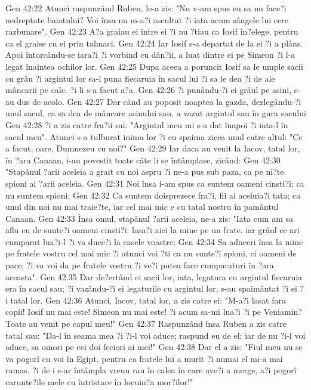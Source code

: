 Gen 42:22  Atunci raspunzând Ruben, le-a zis: "Nu v-am spus eu sa nu face?i nedreptate baiatului? Voi însa nu m-a?i ascultat ?i iata acum sângele lui cere razbunare".
Gen 42:23  A?a graiau ei între ei ?i nu ?tiau ca Iosif în?elege, pentru ca el graise cu ei prin talmaci.
Gen 42:24  Iar Iosif s-a departat de la ei ?i a plâns. Apoi întorcându-se iara?i ?i vorbind cu dân?ii, a luat dintre ei pe Simeon ?i l-a legat înaintea ochilor lor.
Gen 42:25  Dupa aceea a poruncit Iosif sa le umple sacii cu grâu ?i argintul lor sa-l puna fiecaruia în sacul lui ?i sa le dea ?i de ale mâncarii pe cale. ?i li s-a facut a?a.
Gen 42:26  ?i punându-?i ei grâul pe asini, s-au dus de acolo.
Gen 42:27  Dar când au poposit noaptea la gazda, dezlegându-?i unul sacul, ca sa dea de mâncare asinului sau, a vazut argintul sau în gura sacului
Gen 42:28  ?i a zis catre fra?ii sai: "Argintul meu mi s-a dat înapoi ?i iata-l în sacul meu". Atunci s-a tulburat inima lor ?i cu spaima zicea unul catre altul: "Ce a facut, oare, Dumnezeu cu noi?"
Gen 42:29  Iar daca au venit la Iacov, tatal lor, în ?ara Canaan, i-au povestit toate câte li se întâmplase, zicând:
Gen 42:30  "Stapânul ?arii aceleia a grait cu noi aspru ?i ne-a pus sub paza, ca pe ni?te spioni ai ?arii aceleia.
Gen 42:31  Noi însa i-am spus ca suntem oameni cinsti?i; ca nu suntem spioni;
Gen 42:32  Ca suntem doisprezece fra?i, fii ai aceluia?i tata; ca unul din noi nu mai traie?te, iar cel mai mic e cu tatal nostru în pamântul Canaan.
Gen 42:33  Însa omul, stapânul ?arii aceleia, ne-a zis: "Iata cum am sa aflu eu de sunte?i oameni cinsti?i: lasa?i aici la mine pe un frate, iar grâul ce ari cumparat lua?i-l ?i va duce?i la casele voastre;
Gen 42:34  Sa aduceri însa la mine pe fratele vostru cel mai mic ?i atunci voi ?ti ca nu sunte?i spioni, ci oameni de pace, ?i va voi da pe fratele vostru ?i ve?i putea face cumparaturi în ?ara aceasta".
Gen 42:35  Dar de?ertând ei sacii lor, iata, legatura cu argintul fiecaruia era în sacul sau; ?i vazându-?i ei legaturile cu argintul lor, s-au spaimântat ?i ei ?i tatal lor.
Gen 42:36  Atunci, Iacov, tatal lor, a zis catre ei: "M-a?i lasat fara copii! Iosif nu mai este! Simeon nu mai este! ?i acum sa-mi lua?i ?i pe Veniamin? Toate au venit pe capul meu!"
Gen 42:37  Raspunzând însa Ruben a zis catre tatal sau: "Da-l în seama mea ?i ?i-l voi aduce; raspund eu de el; iar de nu ?i-l voi aduce, sa omori pe cei doi feciori ai mei!"
Gen 42:38  Dar el a zis: "Fiul meu nu se va pogorî cu voi în Egipt, pentru ca fratele lui a murit ?i numai el mi-a mai ramas. ?i de i s-ar întâmpla vreun rau în calea în care ave?i a merge, a?i pogorî carunte?ile mele cu întristare în locuin?a mor?ilor!"

